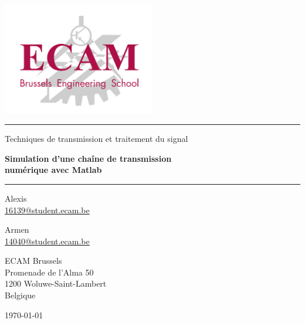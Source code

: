 \documentclass[10pt, oneside, a4paper]{article}
\begin{document}
\begin{titlepage}
    \centering
    \includegraphics[width=0.5\textwidth]{images/logo-ecam.png}\par
    \vspace{1cm}

    \rule{\linewidth}{1.5pt}%
    \vspace{5mm}
    {\rm\sffamily\LARGE Techniques de transmission et traitement du signal\par}
    \vspace{3mm}
    {\sffamily\bfseries\LARGE Simulation d’une chaîne de transmission\\
    						  numérique avec Matlab\textregistered{}\par}
    \vspace{5mm}
    \rule{\linewidth}{1.5pt}%
    \vspace{1cm}

    {\large%
        \begin{minipage}[t]{0.35\linewidth}
            \centering
            Alexis~ \\[1mm]
            \href{mailto:16139@student.ecam.be}{16139@student.ecam.be}
        \end{minipage}
        \begin{minipage}[t]{0.35\linewidth}
            \centering
            Armen~ \\[1mm]
            \href{mailto:14040@student.ecam.be}{14040@student.ecam.be}
        \end{minipage}
    \par}
    \vspace{1cm}

    {\large%
        ECAM Brussels             \\[1mm]
        Promenade de l'Alma 50    \\[1mm]
        1200 Woluwe-Saint-Lambert \\[1mm]
        Belgique
    \par}

    \vfill
    {\large\today\par}
\end{titlepage}
\end{document}
